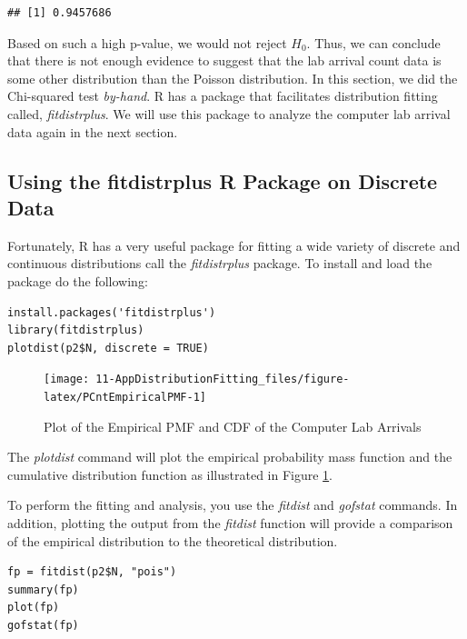 \documentclass[
]{book}
\theoremstyle{definition}
\theoremstyle{definition}
\theoremstyle{definition}
\theoremstyle{definition}
\theoremstyle{remark}
\begin{document}
\begin{verbatim}
## [1] 0.9457686
\end{verbatim}

Based on such a high p-value, we would not reject \(H_0\). Thus, we can conclude that there is not enough evidence to suggest that the lab arrival count data is some other distribution than the Poisson distribution. In this section, we did the Chi-squared test \emph{by-hand}. R has a package that facilitates distribution fitting called, \emph{fitdistrplus}. We will use this package to analyze the computer lab arrival data again in the next section.

\hypertarget{using-the-fitdistrplus-r-package-on-discrete-data}{%
\subsection{Using the fitdistrplus R Package on Discrete Data}\label{using-the-fitdistrplus-r-package-on-discrete-data}}

Fortunately, R has a very useful package for fitting a wide variety of
discrete and continuous distributions call the \emph{fitdistrplus} package.
To install and load the package do the following:

\begin{verbatim}
install.packages('fitdistrplus')
library(fitdistrplus)
plotdist(p2$N, discrete = TRUE)
\end{verbatim}

\begin{figure}

{\centering \texttt{[image: 11-AppDistributionFitting\_files/figure-latex/PCntEmpiricalPMF-1]} 

}

\caption{Plot of the Empirical PMF and CDF of the Computer Lab Arrivals}\label{fig:PCntEmpiricalPMF}
\end{figure}

The \emph{plotdist} command will plot the empirical probability mass function
and the cumulative distribution function as illustrated in Figure \ref{fig:PCntEmpiricalPMF}.

To perform the fitting and analysis, you use the \emph{fitdist} and \emph{gofstat}
commands. In addition, plotting the output from the \emph{fitdist} function
will provide a comparison of the empirical distribution to the
theoretical distribution.

\begin{verbatim}
fp = fitdist(p2$N, "pois")
summary(fp)
plot(fp)
gofstat(fp)
\end{verbatim}
\end{document}
